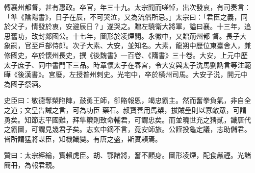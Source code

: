 \begin{pinyinscope}
 轉襄州都督，甚有惠政。卒官，年三十九。太宗聞而嗟悼，出次發哀，有司奏言：「準《陰陽書》，日子在辰，不可哭泣，又為流俗所忌。」太宗曰：「君臣之義，同於父子，情發於衷，安避辰日？」遂哭之。贈左驍衛大將軍，謚曰襄。十三年，追思舊功，改封郯國公。十七年，圖形於凌煙閣。永徽中，又贈荊州都
 督。長子大象嗣，官至戶部侍郎。次子大素、大安，並知名。大素，龍朔中歷位東臺舍人，兼修國史，卒於懷州長史，撰《後魏書》一百卷、《隋書》三十卷。大安，上元中歷太子庶子、同中書門下三品。時章懷太子在春宮，令大安與太子洗馬劉訥言等注範曄《後漢書》。宮廢，左授普州刺史。光宅中，卒於橫州司馬。大安子涚，開元中為國子祭酒。



 史臣曰：敬德奪槊陷陣，鼓勇王師，卻賂報恩，竭忠霸主。然而奮拳負氣，非自全之道；文皇告誡之言，可為功臣
 藥石。叔寶善用馬槊，拔賊壘則以寡敵眾，可謂勇矣。知節志平國難，拜隼籞則致命輔君，可謂忠矣。而並曉世充之猜貳，識唐代之霸圖，可謂見幾君子矣。志玄中鏑不言，竟安師旅。公謹投龜定議，志助儲君。皆所謂猛將謀臣，知機識變。有唐之盛，斯實賴焉。



 贊曰：太宗經綸，實賴虎臣。胡、鄂諸將，奮不顧身。圖形凌煙，配食嚴禋。光諸簡冊，為報君親。



\end{pinyinscope}